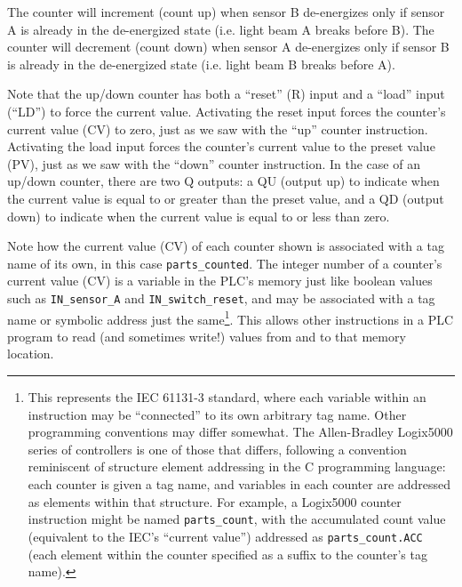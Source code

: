 The counter will increment (count up) when sensor B de-energizes only if sensor A is already in the de-energized state (i.e. light beam A breaks before B).  The counter will decrement (count down) when sensor A de-energizes only if sensor B is already in the de-energized state (i.e. light beam B breaks before A).

\vskip 10pt

Note that the up/down counter has both a ``reset'' (R) input and a ``load'' input (``LD'') to force the current value.  Activating the reset input forces the counter's current value (CV) to zero, just as we saw with the ``up'' counter instruction.  Activating the load input forces the counter's current value to the preset value (PV), just as we saw with the ``down'' counter instruction.  In the case of an up/down counter, there are two Q outputs: a QU (output up) to indicate when the current value is equal to or greater than the preset value, and a QD (output down) to indicate when the current value is equal to or less than zero.

\filbreak

Note how the current value (CV) of each counter shown is associated with a tag name of its own, in this case \texttt{parts\_counted}.  The integer number of a counter's current value (CV) is a variable in the PLC's memory just like boolean values such as \texttt{IN\_sensor\_A} and \texttt{IN\_switch\_reset}, and may be associated with a tag name or symbolic address just the same\footnote{This represents the IEC 61131-3 standard, where each variable within an instruction may be ``connected'' to its own arbitrary tag name.  Other programming conventions may differ somewhat.  The Allen-Bradley Logix5000 series of controllers is one of those that differs, following a convention reminiscent of structure element addressing in the C programming language: each counter is given a tag name, and variables in each counter are addressed as elements within that structure.  For example, a Logix5000 counter instruction might be named \texttt{parts\_count}, with the accumulated count value (equivalent to the IEC's ``current value'') addressed as \texttt{parts\_count.ACC} (each element within the counter specified as a suffix to the counter's tag name).}.  This allows other instructions in a PLC program to read (and sometimes write!) values from and to that memory location.











